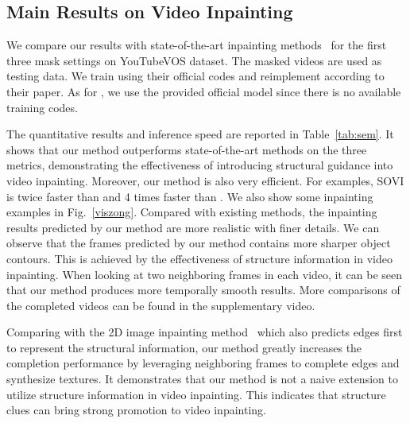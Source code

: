 \subsection{Main Results on Video Inpainting}

We compare our results with state-of-the-art inpainting methods~\cite{nazeri2019edgeconnect,wang2019video,Kim_2019_CVPR1,Xu_2019_CVPR} for the first three mask settings on YouTubeVOS dataset. The masked videos are used as testing data.
%
We train \cite{nazeri2019edgeconnect,Xu_2019_CVPR} using their official codes and reimplement \cite{wang2019video} according to their paper. As for \cite{Kim_2019_CVPR1}, we use the provided official model since there is no available training codes.

The quantitative results and inference speed are reported in Table~\ref{tab:sem}.
It shows that our method outperforms state-of-the-art methods on the three metrics, demonstrating the effectiveness of introducing structural guidance into video inpainting.
Moreover, our method is also very efficient. For examples,
SOVI is twice faster than \cite{Kim_2019_CVPR1} and 4 times faster than \cite{Xu_2019_CVPR}. 
%
We also show some inpainting examples in Fig.~\ref{viszong}.
Compared with existing methods, the inpainting results predicted by our method are more realistic with finer details. 
We can observe that the frames predicted by our method contains more sharper object contours. This is achieved by the effectiveness of structure information in video inpainting.
%
When looking at two neighboring frames in each video, it can be seen that our method produces more temporally smooth results. More comparisons of the completed videos can be found in the supplementary video.




Comparing with the 2D image inpainting method~\cite{nazeri2019edgeconnect} which also predicts edges first to represent 
the structural information, our method greatly increases the completion performance by leveraging neighboring frames to complete edges and synthesize textures. 
%
It demonstrates that our method is not a naive extension to utilize structure information in video inpainting.
This indicates that structure clues can bring strong promotion to video inpainting.


 

%





